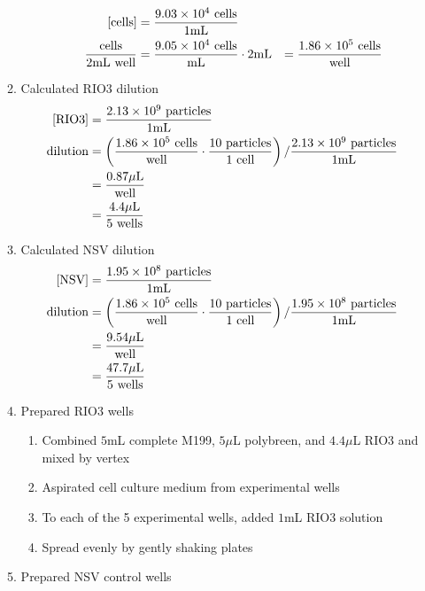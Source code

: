 \begin{enumerate}
\begin{enumerate}
\begin{enumerate}
					\begin{align*}
					\text{[cells]} &= \frac{9.03\times 10^{4}\text{ cells}}{1\text{mL}} \\
					\frac{\text{cells}}{2\text{mL well}} &= \frac{9.05\times 10^{4}\text{ cells}}{\text{mL}} \cdot 2\text{mL} &= \frac{1.86\times 10^{5}\text{ cells}}{\text{well}}\\
					\end{align*}
				\end{enumerate}
			\item Calculated RIO3 dilution
				\begin{align*}
					\text{[RIO3]} &= \frac{2.13\times 10^{9}\text{ particles}}{1\text{mL}}\\
					\text{dilution}&= \left(\frac{1.86\times 10^{5}\text{ cells}}{\text{well}}\cdot \frac{10\text{ particles}}{1\text{ cell}}\right)/\frac{2.13\times 10^{9}\text{ particles}}{1\text{mL}}\\
					&= \frac{0.87\mu\text{L}}{\text{well}}\\
					&= \frac{4.4\mu\text{L}}{5\text{ wells}}
				\end{align*}
			\item Calculated NSV dilution
				\begin{align*}
					\text{[NSV]} &= \frac{1.95\times 10^{8}\text{ particles}}{1\text{mL}}\\
					\text{dilution}&= \left(\frac{1.86\times 10^{5}\text{ cells}}{\text{well}}\cdot \frac{10\text{ particles}}{1\text{ cell}}\right)/\frac{1.95\times 10^{8}\text{ particles}}{1\text{mL}}\\
					&= \frac{9.54\mu\text{L}}{\text{well}}\\
					&= \frac{47.7\mu\text{L}}{5\text{ wells}}
				\end{align*}
			\item Prepared RIO3 wells
				\begin{enumerate}
					\item Combined $5$mL complete M199, $5\mu$L polybreen, and $4.4\mu$L RIO3 and mixed by vertex
					\item Aspirated cell culture medium from experimental wells
					\item To each of the 5 experimental wells, added $1$mL RIO3 solution
					\item Spread evenly by gently shaking plates
				\end{enumerate}
			\item Prepared NSV control wells
				\begin{enumerate}

\end{enumerate}
\end{enumerate}
\end{enumerate}

